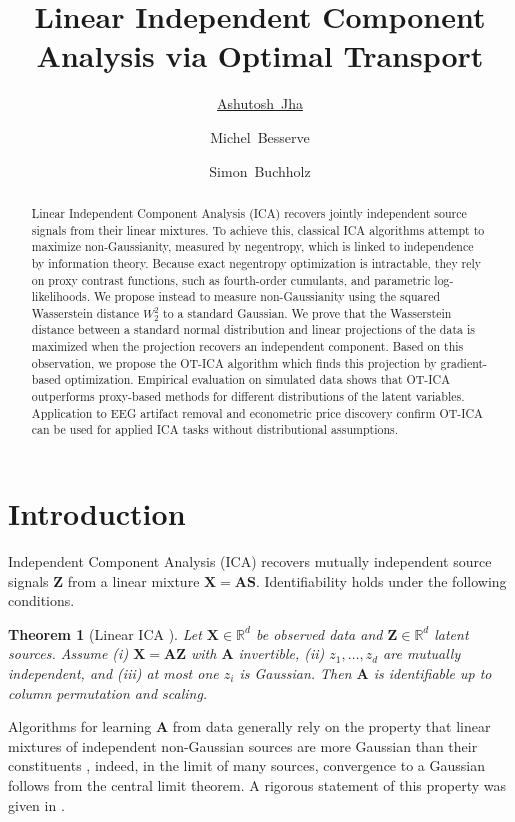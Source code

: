 \documentclass[accepted]{tpm2026} %
\title{Linear Independent Component Analysis via Optimal Transport}
\author[3]{\href{mailto:ashutoshjha3103@gmail.com?Subject=TPM 2026 Paper Inquiry}{Ashutosh~Jha}}
\author[1,2]{Michel~Besserve}
\author[1]{Simon~Buchholz}
\affil[1]{%
    Max Planck Institute for Intelligent Systems, T\"ubingen
}
\affil[2]{%
    Institute of Artificial Intelligence\\
    TU Braunschweig
}
\affil[3]{%
    Methods Center\\
    University of T\"ubingen
}
\newtheorem{theorem}{Theorem}
\begin{document}
\maketitle

\begin{abstract}
Linear Independent Component Analysis (ICA) recovers jointly independent source signals from their linear mixtures. 
 To achieve this, classical ICA algorithms attempt to maximize non-Gaussianity, measured by negentropy, which is linked to independence by information theory. Because exact negentropy optimization is intractable, they rely on proxy contrast functions, such as fourth-order cumulants, and parametric log-likelihoods. 
We propose instead to measure non-Gaussianity using the squared Wasserstein distance $W_2^2$ to a standard Gaussian.
We prove that the Wasserstein distance between a standard normal distribution and linear projections of the data  is maximized when the projection recovers an independent component.
Based on this observation, we propose the OT-ICA algorithm which  finds this projection by gradient-based optimization.
Empirical evaluation on simulated data shows that 
OT-ICA outperforms proxy-based methods for different distributions of the latent variables.
Application to EEG artifact removal and econometric price discovery confirm OT-ICA can be used for applied ICA tasks without distributional assumptions.

\end{abstract}

\section{Introduction}
Independent Component Analysis (ICA) \citep{jutten1985, comon1994} recovers mutually independent source signals $\mathbf{Z}$ from 
a linear mixture $\mathbf{X} = \mathbf{A}\mathbf{S}$. Identifiability holds under the following conditions.

\begin{theorem}[Linear ICA \citep{comon1994}]\label{th:linear_ica}
Let $\mathbf{X} \in \mathbb{R}^d$ be observed data and $\mathbf{Z} \in \mathbb{R}^d$ latent sources. 
Assume (i) $\mathbf{X} = \mathbf{A}\mathbf{Z}$ with $\mathbf{A}$ invertible, (ii) $z_1, \dots, z_d$ are mutually independent, 
and (iii) at most one $z_i$ is Gaussian. Then $\mathbf{A}$ is identifiable up to column permutation and scaling.
\end{theorem}

Algorithms for learning $\mathbf{A}$ from data generally rely on the property that linear mixtures of independent non-Gaussian sources are more Gaussian than their constituents \citep{hyvarinen2001}, indeed, in the limit of many sources, convergence to a Gaussian follows from the central limit theorem.
A rigorous statement of this property was given in \citet{cardoso2022}.
\end{document}
